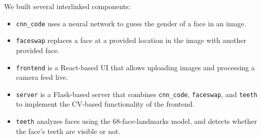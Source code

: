 

We built several interlinked components:

\begin{itemize}
    \item \verb|cnn_code| uses a neural network to guess the gender of a face in an image.
    \item \verb|faceswap| replaces a face at a provided location in the image with another provided face.
    \item \verb|frontend| is a React-based UI that allows uploading images and processing a camera feed live.
    \item \verb|server| is a Flask-based server that combines \verb|cnn_code|, \verb|faceswap|, and \verb|teeth| to implement the CV-based functionality of the frontend.
    \item \verb|teeth| analyzes faces using the 68-face-landmarks model, and detects whether the face’s teeth are visible or not.
\end{itemize}

